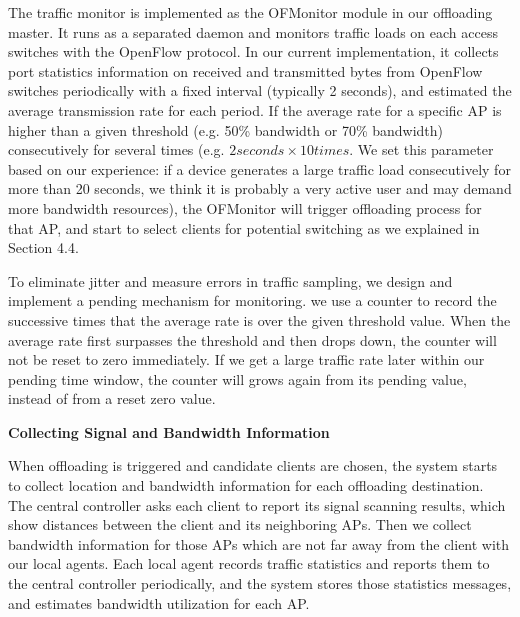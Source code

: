 \documentclass[english]{tktltiki}
\begin{document}
The traffic monitor is implemented as the OFMonitor module in our offloading master. It runs as a separated daemon and monitors traffic loads on each access switches with the OpenFlow protocol. In our current implementation, it collects port statistics information on received and transmitted bytes from OpenFlow switches periodically with a fixed interval (typically 2 seconds), and estimated the average transmission rate for each period. If the average rate for a specific AP is higher than a given threshold (e.g. 50\% bandwidth or 70\% bandwidth) consecutively for several times (e.g. $2seconds \times 10times$. We set this parameter based on our experience: if a device generates a large traffic load consecutively for more than 20 seconds, we think it is probably a very active user and may demand more bandwidth resources), the OFMonitor will trigger offloading process for that AP, and start to select clients for potential switching as we explained in Section 4.4.

To eliminate jitter and measure errors in traffic sampling, we design and implement a pending mechanism for monitoring. we use a counter to record the successive times that the average rate is over the given threshold value. When the average rate first surpasses the threshold and then drops down, the counter will not be reset to zero immediately. If we get a large traffic rate later within our pending time window, the counter will grows again from its pending value, instead of from a reset zero value.

\vspace{1mm}

\textbf{Collecting Signal and Bandwidth Information}

\vspace{1mm}


When offloading is triggered and candidate clients are chosen, the system starts to collect location and bandwidth information for each offloading destination. The central controller asks each client to report its signal scanning results, which show distances between the client and its neighboring APs. Then we collect bandwidth information for those APs which are not far away from the client with our local agents. Each local agent records traffic statistics and reports them to the central controller periodically, and the system stores those statistics messages, and estimates bandwidth utilization for each AP.


\vspace{1mm}
\end{document}
